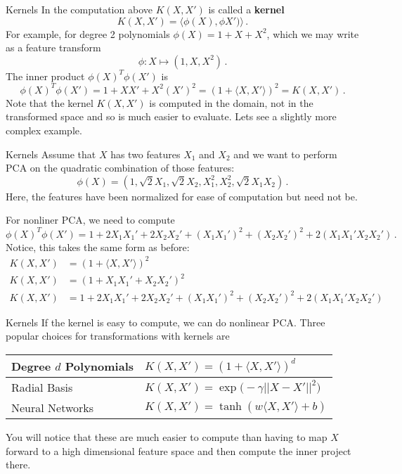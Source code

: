 \documentclass[10pt, table, dvipsnames,xcdraw,handout]{beamer}
\begin{document}
\begin{frame}[fragile]{Kernels}
In the computation above $K(X,X')$ is called a \textbf{kernel}
$$
K(X,X') = \langle \phi(X),\phi X')\rangle\,.
$$\pause
For example, for degree 2 polynomials $\phi(X) = 1 + X + X^2$, which we may write as a feature transform
$$
\phi:X \mapsto (1,X,X^2)\,.
$$\pause
The inner product $\phi(X)^T\phi(X')$  is 
$$
\phi(X)^T\phi(X') = 1 + XX' + X^2(X')^2 = (1 + \langle X, X'\rangle)^2 = K(X,X')\,.
$$
Note that the kernel $K(X,X')$ is computed in the domain, not in the transformed space and so is much easier to evaluate. Lets see a slightly more complex example. 
\end{frame}




\begin{frame}[fragile]{Kernels}
Assume that $X$ has two features $X_1$ and $X_2$ and we want to perform PCA on the quadratic combination of those features:
$$\phi(X) = (1,\sqrt2 X_1,\sqrt2X_2, X_1^2,X_2^2,\sqrt2X_1X_2)\,.$$
Here, the features have been normalized for ease of computation but need not be.\pause

For nonliner PCA, we need to compute
$$
\phi(X)^T\phi(X') = 1 + 2X_1X_1' + 2X_2X_2' + (X_1X_1')^2 + (X_2X_2')^2 + 2(X_1X_1'X_2X_2')\,.
$$
Notice, this takes the same form as before:
\begin{align*}
K(X,X') &= (1+\langle X,X'\rangle)^2
\\
K(X,X') &= (1+X_1X_1' + X_2X_2')^2
\\
K(X,X') &= 1 + 2X_1X_1' + 2X_2X_2' + (X_1X_1')^2 + (X_2X_2')^2 + 2(X_1X_1'X_2X_2')
\end{align*}
\end{frame}


\begin{frame}[fragile]{Kernels}
If the kernel is easy to compute, we can do nonlinear PCA. Three popular choices for transformations with kernels are
\begin{table}[]
\begin{tabular}{ll}
\hline
Degree $d$ Polynomials               & $K(X,X') = (1+\langle X,X'\rangle)^d$                                                  
 \\ \hline
Radial Basis &  $K(X,X') = \exp\big(-\gamma||X-X'||^2\big)$                      
\\ \hline
Neural Networks                    & $K(X,X') =\tanh(w\langle X,X'\rangle + b)$ \\ \hline
\end{tabular}
\end{table}\pause
You will notice that these are much easier to compute than having to map $X$ forward to a high dimensional feature space and then compute the inner project there.
\end{frame}
\end{document}
